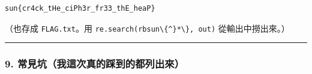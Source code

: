 \documentclass[10pt,a4paper]{article}
\begin{document}
\begin{Verbatim}[breaklines=true,breakanywhere=true,breakautoindent=false,fontsize=\fontsize{7.0}{9.5}\selectfont]
sun{cr4ck_tHe_ciPh3r_fr33_thE_heaP}
\end{Verbatim}

（也存成 \texttt{FLAG.\allowbreak{}txt}。用
\texttt{re.\allowbreak{}search(rb\textquotesingle{}\allowbreak{}sun\textbackslash{}\allowbreak{}\{\allowbreak{}{[}\^\allowbreak{}{}\allowbreak{}\}\allowbreak{}{]}*\textbackslash{}\allowbreak{}\}\allowbreak{}\textquotesingle{}\allowbreak{},\allowbreak{}\ \allowbreak{}out)}
從輸出中撈出來。）

\begin{center}\rule{0.5\linewidth}{0.5pt}\end{center}

\subsubsection{9.
常見坑（我這次真的踩到的都列出來）}\label{ux5e38ux898bux5751ux6211ux9019ux6b21ux771fux7684ux8e29ux5230ux7684ux90fdux5217ux51faux4f86}
\end{document}
